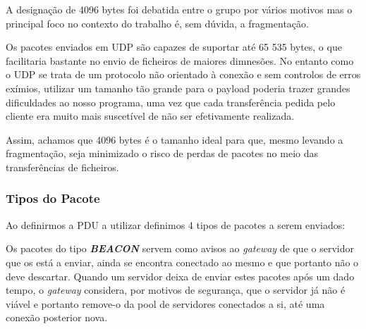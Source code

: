 \documentclass[11pt]{article}
\begin{document}
\par A designação de 4096 bytes foi debatida entre o grupo por vários motivos mas o principal foco no contexto do trabalho é, sem dúvida, a fragmentação.\\

\par Os pacotes enviados em UDP são capazes de suportar até 65 535 bytes, o que facilitaria bastante no envio de ficheiros de maiores dimnesões. No entanto como o UDP se trata de um protocolo não orientado à conexão e sem controlos de erros exímios, utilizar um tamanho tão grande para o payload poderia trazer grandes dificuldades ao nosso programa, uma vez que cada transferência pedida pelo cliente era muito mais suscetível de não ser efetivamente realizada.\\

\par Assim, achamos que 4096 bytes é o tamanho ideal para que, mesmo levando a fragmentação, seja minimizado o risco de perdas de pacotes no meio das transferências de ficheiros.

\subsubsection{Tipos do Pacote}

\par Ao definirmos a PDU a utilizar definimos 4 tipos de pacotes a serem enviados:

\begin{table}[!h]
\end{table}

\par Os pacotes do tipo \textit{\textbf{BEACON}} servem como avisos ao \textit{gateway} de que o servidor que os está a enviar, ainda se encontra conectado ao mesmo e que portanto não o deve descartar. Quando um servidor deixa de enviar estes pacotes após um dado tempo, o \textit{gateway} considera, por motivos de segurança, que o servidor já não é viável e portanto remove-o da pool de servidores conectados a si, até uma conexão posterior nova.\\
\end{document}
